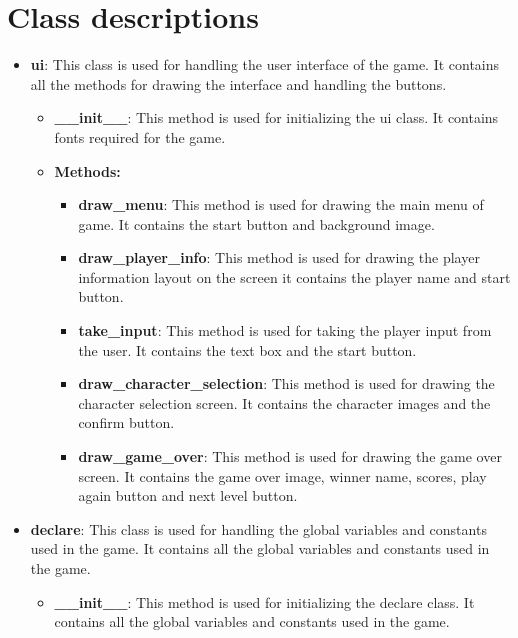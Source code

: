 \documentclass[12pt]{article}
\begin{document}
\section{Class descriptions}
\begin{itemize}
    \item \textbf{ui}: This class is used for handling the user interface of the game. It contains all the methods for drawing the interface and handling the buttons.
        \begin{itemize}
            \item \textbf{\_\_init\_\_}: This method is used for initializing the ui class. It contains fonts required for the game.
            \item \textbf{Methods:}
                \begin{itemize}
                    \item \textbf{draw\_menu}: This method is used for drawing the main menu of game. It contains the start button and background image.
                    \item \textbf{draw\_player\_info}: This method is used for drawing the player information layout on the screen it contains the player name and start button.
                    \item \textbf{take\_input}: This method is used for taking the player input from the user. It contains the text box and the start button.
                    \item \textbf{draw\_character\_selection}: This method is used for drawing the character selection screen. It contains the character images and the confirm button.
                    \item \textbf{draw\_game\_over}: This method is used for drawing the game over screen. It contains the game over image, winner name, scores, play again button and next level button.
                \end{itemize}
        \end{itemize}
    \item \textbf{declare}: This class is used for handling the global variables and constants used in the game. It contains all the global variables and constants used in the game.
        \begin{itemize}
            \item \textbf{\_\_init\_\_}: This method is used for initializing the declare class. It contains all the global variables and constants used in the game.       
        \end{itemize}

\end{itemize}
\end{document}
